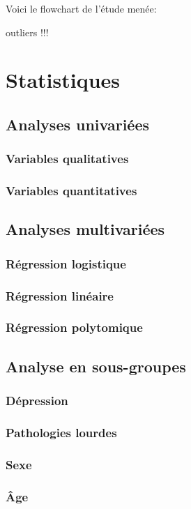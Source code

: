 \documentclass{book}
\begin{document}
Voici le flowchart de l'étude menée:

outliers !!!
\newpage
\section{Statistiques}
\subsection{Analyses univariées}
\subsubsection{Variables qualitatives}
\subsubsection{Variables quantitatives}
\subsection{Analyses multivariées}
\subsubsection{Régression logistique}
\subsubsection{Régression linéaire}
\subsubsection{Régression polytomique}
\subsection{Analyse en sous-groupes}
\subsubsection{Dépression}
\subsubsection{Pathologies lourdes}
\subsubsection{Sexe}
\subsubsection{Âge}
\end{document}
